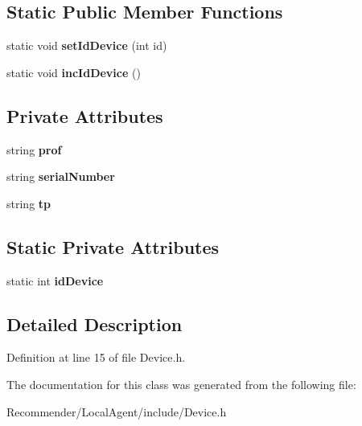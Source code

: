 \subsection*{Static Public Member Functions}
\begin{CompactItemize}
\item 
static void \textbf{setIdDevice} (int id)\label{classbr_1_1ufscar_1_1lince_1_1ginga_1_1recommender_1_1Device_e7ff74b10048510b24409d4df1890300}

\item 
static void \textbf{incIdDevice} ()\label{classbr_1_1ufscar_1_1lince_1_1ginga_1_1recommender_1_1Device_bec3bfcbefa8c9a066827c7b9d16f34b}

\end{CompactItemize}
\subsection*{Private Attributes}
\begin{CompactItemize}
\item 
string {\bf prof}\label{classbr_1_1ufscar_1_1lince_1_1ginga_1_1recommender_1_1Device_26d8c944cf06bf8af51627a5ca115bfd}

\item 
string {\bf serialNumber}\label{classbr_1_1ufscar_1_1lince_1_1ginga_1_1recommender_1_1Device_22248d5005f91728b723f7deb2eb17b2}

\item 
string {\bf tp}\label{classbr_1_1ufscar_1_1lince_1_1ginga_1_1recommender_1_1Device_fc90961a66359393f789a52a80c3939e}

\end{CompactItemize}
\subsection*{Static Private Attributes}
\begin{CompactItemize}
\item 
static int {\bf idDevice}\label{classbr_1_1ufscar_1_1lince_1_1ginga_1_1recommender_1_1Device_2f4e05fcacd1a7da468abf831af9dd40}

\end{CompactItemize}


\subsection{Detailed Description}




Definition at line 15 of file Device.h.

The documentation for this class was generated from the following file:\begin{CompactItemize}
\item 
Recommender/LocalAgent/include/Device.h\end{CompactItemize}
